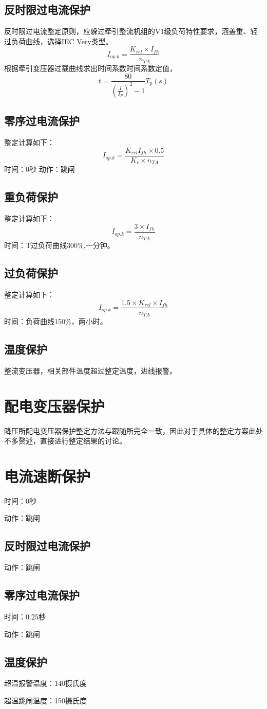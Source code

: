 \subsection{反时限过电流保护}
反时限过电流整定原则，应躲过牵引整流机组的V1级负荷特性要求，涵盖重、轻过负荷曲线，选择IEC Very类型。
$$
I_{op.k}=\frac{K_{rel}\times I_{fh}}{n_{TA}}
$$
根据牵引变压器过载曲线求出时间系数时间系数定值，
$$
t=\frac{80}{(\frac{I}{I_P})^2-1}T_p(s)
$$
\subsection{零序过电流保护}
整定计算如下：
$$
I_{op.k}=\frac{K_{rel}I_{fh}\times 0.5}{K_r\times n_{TA}}
$$
时间：0秒 \newline
动作：跳闸
\subsection{重负荷保护}
整定计算如下：
$$
I_{op.k}=\frac{3\times I_{fh}}{n_{TA}}
$$
时间：T过负荷曲线300\%,一分钟。
\subsection{过负荷保护}
整定计算如下：
$$
I_{op.k}=\frac{1.5\times K_{rel}\times I_{fh}}{n_{TA}}
$$
时间：负荷曲线150\%，两小时。
\subsection{温度保护}
整流变压器，相关部件温度超过整定温度，进线报警。
\section{配电变压器保护}
降压所配电变压器保护整定方法与跟随所完全一致，因此对于具体的整定方案此处不多赘述，直接进行整定结果的讨论。
\section{电流速断保护}
时间：0秒\par 
动作：跳闸
\subsection{反时限过电流保护}
动作：跳闸
\subsection{零序过电流保护}
时间：0.25秒\par
动作：跳闸
\subsection{温度保护}
超温报警温度：140摄氏度\par 
超温跳闸温度：150摄氏度


